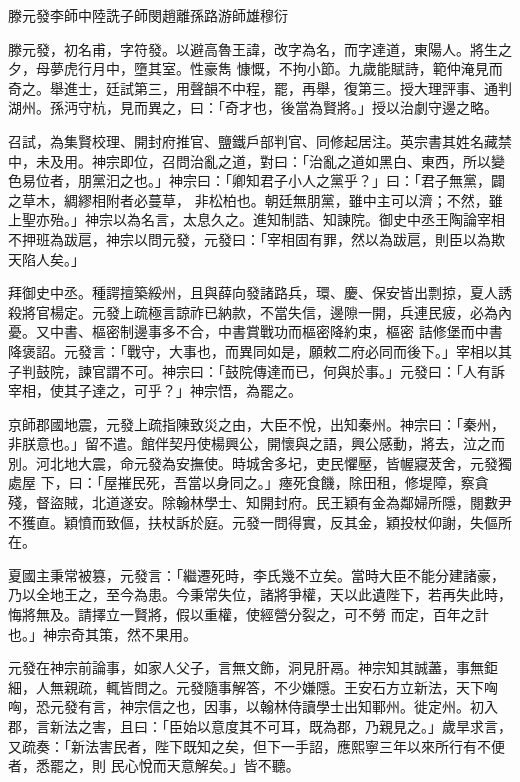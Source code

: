 
\begin{pinyinscope}

 滕元發李師中陸詵子師閔趙離孫路游師雄穆衍



 滕元發，初名甫，字符發。以避高魯王諱，改字為名，而字達道，東陽人。將生之夕，母夢虎行月中，墮其室。性豪雋
 慷慨，不拘小節。九歲能賦詩，範仲淹見而奇之。舉進士，廷試第三，用聲韻不中程，罷，再舉，復第三。授大理評事、通判湖州。孫沔守杭，見而異之，曰：「奇才也，後當為賢將。」授以治劇守邊之略。



 召試，為集賢校理、開封府推官、鹽鐵戶部判官、同修起居注。英宗書其姓名藏禁中，未及用。神宗即位，召問治亂之道，對曰：「治亂之道如黑白、東西，所以變色易位者，朋黨汩之也。」神宗曰：「卿知君子小人之黨乎？」曰：「君子無黨，闢之草木，綢繆相附者必蔓草，
 非松柏也。朝廷無朋黨，雖中主可以濟；不然，雖上聖亦殆。」神宗以為名言，太息久之。進知制誥、知諫院。御史中丞王陶論宰相不押班為跋扈，神宗以問元發，元發曰：「宰相固有罪，然以為跋扈，則臣以為欺天陷人矣。」



 拜御史中丞。種諤擅築綏州，且與薛向發諸路兵，環、慶、保安皆出剽掠，夏人誘殺將官楊定。元發上疏極言諒祚已納款，不當失信，邊隙一開，兵連民疲，必為內憂。又中書、樞密制邊事多不合，中書賞戰功而樞密降約束，樞密
 詰修堡而中書降褒詔。元發言：「戰守，大事也，而異同如是，願敕二府必同而後下。」宰相以其子判鼓院，諫官謂不可。神宗曰：「鼓院傳達而已，何與於事。」元發曰：「人有訴宰相，使其子達之，可乎？」神宗悟，為罷之。



 京師郡國地震，元發上疏指陳致災之由，大臣不悅，出知秦州。神宗曰：「秦州，非朕意也。」留不遣。館伴契丹使楊興公，開懷與之語，興公感動，將去，泣之而別。河北地大震，命元發為安撫使。時城舍多圮，吏民懼壓，皆幄寢茇舍，元發獨處屋
 下，曰：「屋摧民死，吾當以身同之。」瘞死食饑，除田租，修堤障，察貪殘，督盜賊，北道遂安。除翰林學士、知開封府。民王穎有金為鄰婦所隱，閱數尹不獲直。穎憤而致傴，扶杖訴於庭。元發一問得實，反其金，穎投杖仰謝，失傴所在。



 夏國主秉常被篡，元發言：「繼遷死時，李氏幾不立矣。當時大臣不能分建諸豪，乃以全地王之，至今為患。今秉常失位，諸將爭權，天以此遺陛下，若再失此時，悔將無及。請擇立一賢將，假以重權，使經營分裂之，可不勞
 而定，百年之計也。」神宗奇其策，然不果用。



 元發在神宗前論事，如家人父子，言無文飾，洞見肝鬲。神宗知其誠藎，事無鉅細，人無親疏，輒皆問之。元發隨事解答，不少嫌隱。王安石方立新法，天下哅哅，恐元發有言，神宗信之也，因事，以翰林侍讀學士出知鄆州。徙定州。初入郡，言新法之害，且曰：「臣始以意度其不可耳，既為郡，乃親見之。」歲旱求言，又疏奏：「新法害民者，陛下既知之矣，但下一手詔，應熙寧三年以來所行有不便者，悉罷之，則
 民心悅而天意解矣。」皆不聽。




\end{pinyinscope}
